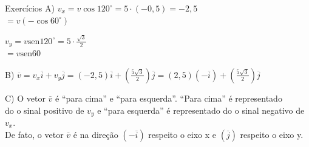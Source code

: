 \documentclass{beamer}
\begin{document}
\begin{frame}{Exercícios}
	\vspace{0.2cm}
	A) \hspace{0.2cm} $v_x = v \cos 120^\circ = 5 \cdot (-0,5) = -2,5$ \\
	\hspace{0.85cm} \raisebox{0.1cm}{$\big\vert$} $= v(-\cos 60^\circ)$ 
	
	\vspace{0.2cm}
	\hspace{0.6cm} $v_y = v \text{sen} 120^\circ = 5 \cdot \frac{\sqrt{3}}{2}$ \\
	\hspace{0.85cm} \raisebox{0.1cm}{$\big\vert$} $= v \text{sen} 60$
	
	\vspace{0.3cm}
	B) \quad $\overline{v} = v_x \overline{i} + v_y \overline{j} = (-2,5)\overline{i} + \left(\frac{5\sqrt{3}}{2}\right)\overline{j} = (2,5)(-\overline{i}) + \left(\frac{5\sqrt{3}}{2}\right)\overline{j}$
	
	\vspace{0.3cm}
	C) \quad O vetor $\overline{v}$ é ``para cima'' e ``para esquerda''. ``Para cima'' é representado \\
	\hspace{0.65cm} do o sinal positivo de $v_y$ e ``para esquerda'' é representado do o sinal negativo de $v_x$. \\
	\hspace{0.65cm} De fato, o vetor $\overline{v}$ é na direção $(-\overline{i})$ respeito o eixo x e $(\overline{j})$ respeito o eixo y.
	
\end{frame}
\end{document}
